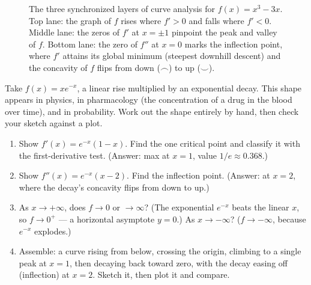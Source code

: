 \begin{figure}[H]
\caption{The three synchronized layers of curve analysis for $f(x)=x^3-3x$.
Top lane: the graph of $f$ rises where $f'>0$ and falls where $f'<0$.
Middle lane: the zeros of $f'$ at $x=\pm1$ pinpoint the peak and valley of $f$.
Bottom lane: the zero of $f''$ at $x=0$ marks the inflection point, where $f'$ attains
its global minimum (steepest downhill descent) and the concavity of $f$ flips from
down ($\frown$) to up ($\smile$).}
\label{ch16:fig-f-and-fprime}
\end{figure}

\begin{labbox}
Take $f(x)=x e^{-x}$, a linear rise multiplied by an exponential decay. This
shape appears in physics, in pharmacology (the concentration of a drug in the
blood over time), and in probability. Work out the shape entirely by hand, then check your sketch against a
plot.
\begin{enumerate}
\item Show $f'(x)=e^{-x}(1-x)$. Find the one critical point and classify it with
the first-derivative test. (Answer: max at $x=1$, value $1/e\approx0.368$.)
\item Show $f''(x)=e^{-x}(x-2)$. Find the inflection point. (Answer: at $x=2$,
where the decay's concavity flips from down to up.)
\item As $x\to+\infty$, does $f\to0$ or $\to\infty$? (The exponential
$e^{-x}$ beats the linear $x$, so $f\to0^+$ --- a horizontal asymptote $y=0$.) As
$x\to-\infty$? ($f\to-\infty$, because $e^{-x}$ explodes.)
\item Assemble: a curve rising from below, crossing the origin, climbing to a single
peak at $x=1$, then decaying back toward zero, with the decay easing off (inflection)
at $x=2$. Sketch it, then plot it and compare.
\end{enumerate}
\end{labbox}

